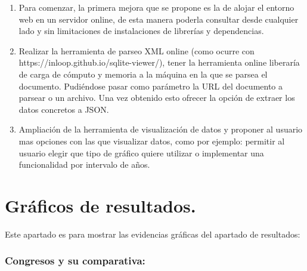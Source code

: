 \documentclass[a4paper, 12pt]{book}
\begin{document}
\begin{enumerate}
    \item Para comenzar, la primera mejora que se propone es la de alojar el entorno web en un servidor online, de esta manera poderla consultar desde cualquier lado y sin limitaciones de instalaciones de librerías y dependencias.
    \item Realizar la herramienta de parseo XML online (como ocurre con https://inloop.github.io/sqlite-viewer/), tener la herramienta online liberaría de carga de cómputo y memoria a la máquina en la que se parsea el documento. Pudiéndose pasar como parámetro la URL del documento a parsear o un archivo. Una vez obtenido esto ofrecer la opción de extraer los datos concretos a JSON.
    \item Ampliación de la herramienta de visualización de datos y proponer al usuario mas opciones con las que visualizar datos, como por ejemplo: permitir al usuario elegir que tipo de gráfico quiere utilizar o implementar una funcionalidad por intervalo de años.
    
\end{enumerate}



\cleardoublepage
\appendix
\chapter{Gráficos de resultados.}
\label{app:manual}

Este apartado es para mostrar las evidencias gráficas del apartado de resultados:

\subsection{Congresos y su comparativa:}
\end{document}
